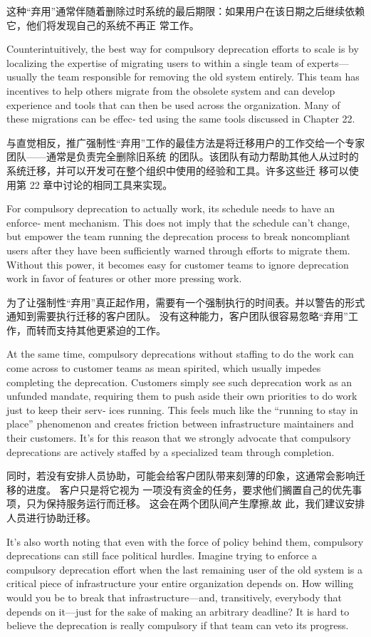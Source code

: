 \documentclass[10pt,a4paper,UTF8]{ctexart}
\begin{document}
这种“弃用”通常伴随着删除过时系统的最后期限：如果用户在该日期之后继续依赖它，他们将发现自己的系统不再正
常工作。

Counterintuitively, the best way for compulsory deprecation efforts to scale is by localizing the
expertise of migrating users to within a single team of experts—usually the team responsible for
removing the old system entirely. This team has incentives to help others migrate from the obsolete
system and can develop experience and tools that can then be used across the organization. Many of
these migrations can be effec‐ ted using the same tools discussed in Chapter 22.

与直觉相反，推广强制性“弃用”工作的最佳方法是将迁移用户的工作交给一个专家团队——通常是负责完全删除旧系统
的团队。该团队有动力帮助其他人从过时的系统迁移，并可以开发可在整个组织中使用的经验和工具。许多这些迁
移可以使用第 22 章中讨论的相同工具来实现。

For compulsory deprecation to actually work, its schedule needs to have an enforce‐ ment mechanism.
This does not imply that the schedule can’t change, but empower the team running the deprecation
process to break noncompliant users after they have been sufficiently warned through efforts to
migrate them. Without this power, it becomes easy for customer teams to ignore deprecation work in
favor of features or other more pressing work.

为了让强制性“弃用”真正起作用，需要有一个强制执行的时间表。并以警告的形式通知到需要执行迁移的客户团队。
没有这种能力，客户团队很容易忽略“弃用”工作，而转而支持其他更紧迫的工作。

At the same time, compulsory deprecations without staffing to do the work can come across to
customer teams as mean spirited, which usually impedes completing the deprecation. Customers simply
see such deprecation work as an unfunded mandate, requiring them to push aside their own priorities
to do work just to keep their serv‐ ices running. This feels much like the “running to stay in
place” phenomenon and creates friction between infrastructure maintainers and their customers. It’s
for this reason that we strongly advocate that compulsory deprecations are actively staffed by a
specialized team through completion.


同时，若没有安排人员协助，可能会给客户团队带来刻薄的印象，这通常会影响迁移的进度。 客户只是将它视为
一项没有资金的任务，要求他们搁置自己的优先事项，只为保持服务运行而迁移。 这会在两个团队间产生摩擦,故
此，我们建议安排人员进行协助迁移。

It’s also worth noting that even with the force of policy behind them, compulsory deprecations can
still face political hurdles. Imagine trying to enforce a compulsory deprecation effort when the
last remaining user of the old system is a critical piece of infrastructure your entire organization
depends on. How willing would you be to break that infrastructure—and, transitively, everybody that
depends on it—just for the sake of making an arbitrary deadline? It is hard to believe the
deprecation is really compulsory if that team can veto its progress.
\end{document}
